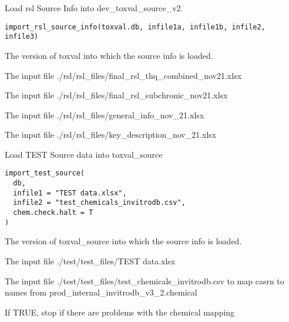 \documentclass[letterpaper]{book}
\begin{document}
%
\begin{Description}\relax
Load rsl Source Info into dev\_toxval\_source\_v2.
\end{Description}
%
\begin{Usage}
\begin{verbatim}
import_rsl_source_info(toxval.db, infile1a, infile1b, infile2, infile3)
\end{verbatim}
\end{Usage}
%
\begin{Arguments}
\begin{ldescription}
\item[\code{toxval.db}] The version of toxval into which the source info is loaded.

\item[\code{infile1a}] The input file ./rsl/rsl\_files/final\_rsl\_thq\_combined\_nov21.xlsx

\item[\code{infile1b}] The input file ./rsl/rsl\_files/final\_rsl\_subchronic\_nov21.xlsx

\item[\code{infile2}] The input file ./rsl/rsl\_files/general\_info\_nov\_21.xlsx

\item[\code{infile3}] The input file ./rsl/rsl\_files/key\_description\_nov\_21.xlsx
\end{ldescription}
\end{Arguments}
%
\begin{Description}\relax
Load TEST Source data into toxval\_source
\end{Description}
%
\begin{Usage}
\begin{verbatim}
import_test_source(
  db,
  infile1 = "TEST data.xlsx",
  infile2 = "test_chemicals_invitrodb.csv",
  chem.check.halt = T
)
\end{verbatim}
\end{Usage}
%
\begin{Arguments}
\begin{ldescription}
\item[\code{db}] The version of toxval\_source into which the source info is loaded.

\item[\code{infile1}] The input file ./test/test\_files/TEST data.xlsx

\item[\code{infile2}] The input file ./test/test\_files/test\_chemicals\_invitrodb.csv to map casrn to names from prod\_internal\_invitrodb\_v3\_2.chemical

\item[\code{chem.check.halt}] If TRUE, stop if there are problems with the chemical mapping
\end{ldescription}
\end{Arguments}
\end{document}

